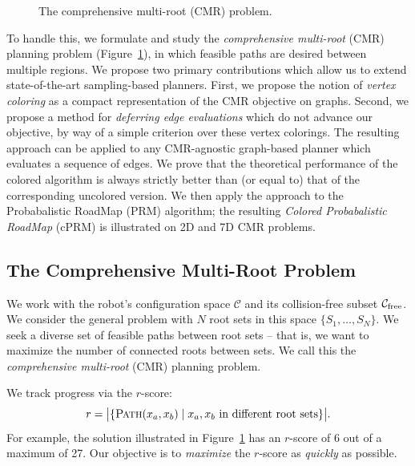 \begin{figure}
{{
      }
      \label{subfig:cmr-illustration}
   }
   \caption{The comprehensive multi-root (CMR) problem.}
   \label{fig:cmr-problems}
\end{figure}

To handle this,
we formulate and study the
\emph{comprehensive multi-root} (CMR) planning problem
\cite{dellin2015cmr} (Figure~\ref{fig:cmr-problems}),
in which feasible paths are desired between multiple regions.
We propose two primary contributions which allow us to extend
state-of-the-art sampling-based planners.
First, we propose the notion of \emph{vertex coloring} as a compact
representation of the CMR objective on graphs.
Second, we propose a method for \emph{deferring edge evaluations}
which do not advance our objective, by way of a simple
criterion over these vertex colorings.
The resulting approach can be applied to any CMR-agnostic 
graph-based planner which evaluates a sequence of edges.
We prove that the theoretical performance of the colored algorithm
is always strictly better than (or equal to)
that of the corresponding uncolored version.
We then apply the approach to the Probabalistic RoadMap (PRM)
algorithm;
the resulting \emph{Colored Probabalistic RoadMap} (cPRM)
is illustrated on 2D and 7D CMR problems.

\subsection{The Comprehensive Multi-Root Problem}

We work with the robot's configuration space $\mathcal{C}$
and its collision-free subset $\mathcal{C}_{\mbox{\scriptsize free}}$.
We consider the general problem with $N$ root sets in this space
$\{ S_1, \dots, S_N \}$.
We seek a diverse set of feasible paths between root sets
-- that is, we want to maximize the number of connected roots between sets. 
We call this the \emph{comprehensive multi-root} (CMR) planning problem.

We track progress via the $r$-score:
\begin{equation}
   r = \big| \{
      \textsc{Path}(x_a,x_b) \;|\; x_a,x_b~\text{in different root sets}
      \} \big|.
   \label{eqn:obj}
\end{equation}
For example, the solution illustrated in
Figure~\ref{fig:cmr-problems}
has an $r$-score of 6 out of a maximum of 27.
Our objective is to \emph{maximize} the $r$-score as \emph{quickly} as
possible.

